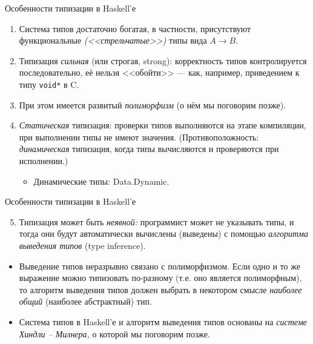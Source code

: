 \documentclass[xcolor=dvipsnames]{beamer}
\begin{document}
\begin{frame}[fragile]{Особенности типизации в Haskell'е}

\begin{enumerate}[<+->]
\item Система типов достаточно богатая, в частности, присутствуют функциональные {\em (<<стрельчатые>>)} типы вида $A \to B$.
\item Типизация {\em сильная} (или строгая, strong): корректность типов контролируется последовательно, её нельзя <<обойти>> --- как, например, приведением к типу \texttt{void*} в C.
\item При этом имеется развитый {\em полиморфизм} (о нём мы поговорим позже).
\item {\em Статическая} типизация: проверки типов выполняются на этапе компиляции, при выполнении типы не имеют значения. (Противоположность: {\em динамическая} типизация, когда типы вычисляются и проверяются при исполнении.) 
\begin{itemize}
 \item Динамические типы: Data.Dynamic.
\end{itemize}

\end{enumerate}
\end{frame}

\begin{frame}{Особенности типизации в Haskell'е}
 
 \begin{enumerate}\setcounter{enumi}{4}
  \item Типизация может быть {\em неявной:} программист может не указывать типы, и тогда они будут автоматически вычислены (выведены) с помощью {\em алгоритма выведения типов} (type inference). 
 \end{enumerate}

 
 \begin{itemize}
  \item<3-> Выведение типов неразрывно связано с полиморфизмом. Если одно и то же выражение можно типизовать по-разному (т.е. оно является полиморфным), то алгоритм выведения типов должен выбрать в некотором смысле {\em наиболее общий} (наиболее абстрактный) тип.
  \item<4-> Система типов в Haskell'е и алгоритм выведения типов основаны на {\em системе Хиндли -- Милнера,} о которой мы поговорим  позже.
 \end{itemize}

\end{frame}
\end{document}
